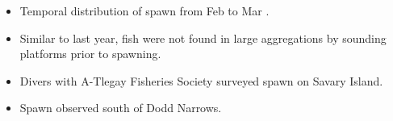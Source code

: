 \begin{itemize}

\item Temporal distribution of spawn from Feb  to Mar .

\item Similar to last year,
fish were not found in large aggregations by sounding platforms prior to spawning.

\item Divers with A-Tlegay Fisheries Society surveyed spawn on Savary Island.

\item Spawn observed south of Dodd Narrows.

\end{itemize}